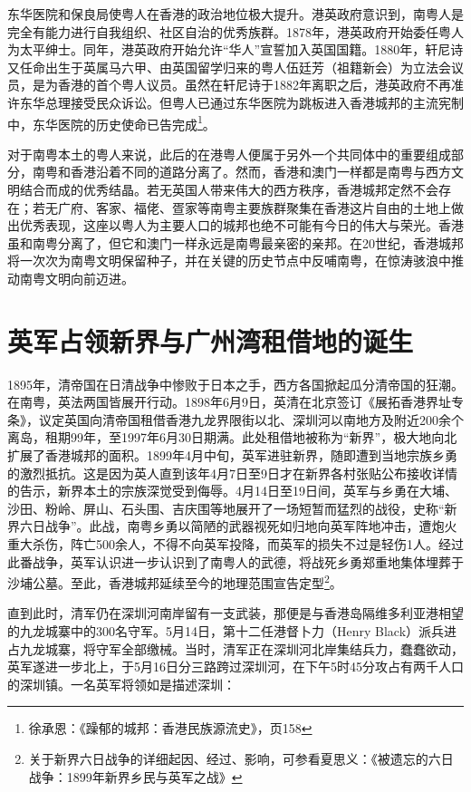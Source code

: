 东华医院和保良局使粤人在香港的政治地位极大提升。港英政府意识到，南粤人是完全有能力进行自我组织、社区自治的优秀族群。1878年，港英政府开始委任粤人为太平绅士。同年，港英政府开始允许“华人”宣誓加入英国国籍。1880年，轩尼诗又任命出生于英属马六甲、由英国留学归来的粤人伍廷芳（祖籍新会）为立法会议员，是为香港的首个粤人议员。虽然在轩尼诗于1882年离职之后，港英政府不再准许东华总理接受民众诉讼。但粤人已通过东华医院为跳板进入香港城邦的主流宪制中，东华医院的历史使命已告完成\footnote{徐承恩：《躁郁的城邦：香港民族源流史》，页158}。

对于南粤本土的粤人来说，此后的在港粤人便属于另外一个共同体中的重要组成部分，南粤和香港沿着不同的道路分离了。然而，香港和澳门一样都是南粤与西方文明结合而成的优秀结晶。若无英国人带来伟大的西方秩序，香港城邦定然不会存在；若无广府、客家、福佬、疍家等南粤主要族群聚集在香港这片自由的土地上做出优秀表现，这座以粤人为主要人口的城邦也绝不可能有今日的伟大与荣光。香港虽和南粤分离了，但它和澳门一样永远是南粤最亲密的亲邦。在20世纪，香港城邦将一次次为南粤文明保留种子，并在关键的历史节点中反哺南粤，在惊涛骇浪中推动南粤文明向前迈进。

\section{英军占领新界与广州湾租借地的诞生}

\indent 1895年，清帝国在日清战争中惨败于日本之手，西方各国掀起瓜分清帝国的狂潮。在南粤，英法两国皆展开行动。1898年6月9日，英清在北京签订《展拓香港界址专条》，议定英国向清帝国租借香港九龙界限街以北、深圳河以南地方及附近200余个离岛，租期99年，至1997年6月30日期满。此处租借地被称为“新界”，极大地向北扩展了香港城邦的面积。1899年4月中旬，英军进驻新界，随即遭到当地宗族乡勇的激烈抵抗。这是因为英人直到该年4月7日至9日才在新界各村张贴公布接收详情的告示，新界本土的宗族深觉受到侮辱。4月14日至19日间，英军与乡勇在大埔、沙田、粉岭、屏山、石头围、吉庆围等地展开了一场短暂而猛烈的战役，史称“新界六日战争”。此战，南粤乡勇以简陋的武器视死如归地向英军阵地冲击，遭炮火重大杀伤，阵亡500余人，不得不向英军投降，而英军的损失不过是轻伤1人。经过此番战争，英军认识进一步认识到了南粤人的武德，将战死乡勇郑重地集体埋葬于沙埔公墓。至此，香港城邦延续至今的地理范围宣告定型\footnote{关于新界六日战争的详细起因、经过、影响，可参看夏思义：《被遗忘的六日战争：1899年新界乡民与英军之战》}。

直到此时，清军仍在深圳河南岸留有一支武装，那便是与香港岛隔维多利亚港相望的九龙城寨中的300名守军。5月14日，第十二任港督卜力（Henry Black）派兵进占九龙城寨，将守军全部缴械。当时，清军正在深圳河北岸集结兵力，蠢蠢欲动，英军遂进一步北上，于5月16日分三路跨过深圳河，在下午5时45分攻占有两千人口的深圳镇。一名英军将领如是描述深圳：

